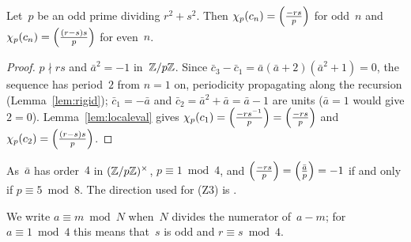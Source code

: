 \begin{lemma}[Primes of $r^2 + s^2$]
  \label{lem:pat-r2s2}
  \leanok
  Let~$p$ be an odd prime dividing $r^2 + s^2$. Then $\chi_p(c_n) = \left(\frac{-rs}{p}\right)$ for odd~$n$ and
  $\chi_p(c_n) = \left(\frac{(r - s)s}{p}\right)$ for even~$n$.
\end{lemma}
\begin{proof}
  \leanok
  $p \nmid rs$ and $\bar a^2 = -1$ in~$\mathbb{Z}/p\mathbb{Z}$. Since
  $\bar c_3 - \bar c_1 = \bar a(\bar a + 2)(\bar a^2 + 1) = 0$, the sequence has period~$2$ from
  $n = 1$ on, periodicity propagating along the recursion (Lemma~\ref{lem:rigid});
  $\bar c_1 = -\bar a$ and $\bar c_2 = \bar a^2 + \bar a =
  \bar a - 1$ are units ($\bar a = 1$ would give $2 = 0$). Lemma~\ref{lem:localeval} gives
  $\chi_p(c_1) = \left(\frac{-r s^{-1}}{p}\right) = \left(\frac{-rs}{p}\right)$ and $\chi_p(c_2) = \left(\frac{(r-s)s}{p}\right)$.
\end{proof}

\begin{remark}
  As~$\bar a$ has order~$4$ in $(\mathbb{Z}/p\mathbb{Z})^\times$, $p \equiv 1 \bmod 4$, and
  $\left(\frac{-rs}{p}\right) = \left(\frac{\bar a}{p}\right) = -1$ if and only if $p \equiv 5 \bmod 8$. The direction used
  for (Z3) is .
\end{remark}

We write $a \equiv m \bmod N$ when~$N$ divides the numerator of~$a - m$; for $a \equiv 1 \bmod 4$
this means that~$s$ is odd and $r \equiv s \bmod 4$.

